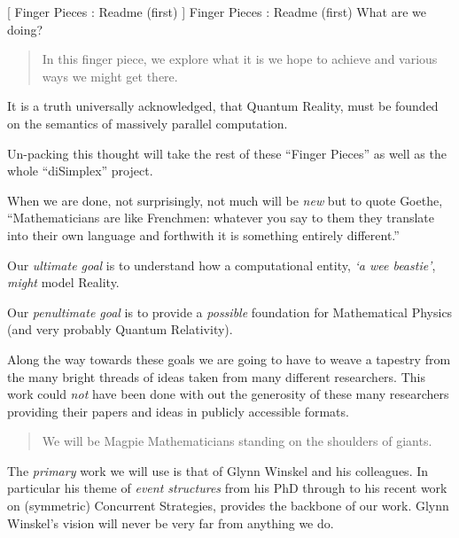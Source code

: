 
[
  Finger Pieces : Readme (first)
]{
  Finger Pieces : Readme (first) What are we doing?
}
\author{Stephen Gaito}

\maketitle

\begin{abstract}
  In this finger piece, we explore what it is we hope to achieve and various
  ways we might get there.
\end{abstract}


It is a truth universally acknowledged, that Quantum Reality, must be founded on
the semantics of massively parallel computation.

Un-packing this thought will take the rest of these ``Finger Pieces'' as well as
the whole ``diSimplex'' project. 

When we are done, not surprisingly, not much will be \emph{new} but to quote
Goethe, ``Mathematicians are like Frenchmen: whatever you say to them they
translate into their own language and forthwith it is something entirely
different.''

Our \emph{ultimate goal} is to understand how a computational entity, \emph{`a
wee beastie'}, \emph{might} model Reality.

Our \emph{penultimate goal} is to provide a \emph{possible} foundation for
Mathematical Physics (and very probably Quantum Relativity).

Along the way towards these goals we are going to have to weave a tapestry from
the many bright threads of ideas taken from many different researchers. This
work could \emph{not} have been done with out the generosity of these many
researchers providing their papers and ideas in publicly accessible formats.

\begin{quote}
  We will be Magpie Mathematicians standing on the shoulders of
  giants.
\end{quote}

The \emph{primary} work we will use is that of Glynn Winskel and his colleagues.
In particular his theme of \emph{event structures} from his PhD through to his
recent work on (symmetric) Concurrent Strategies, provides the backbone of our
work. Glynn Winskel's vision will never be very far from anything we do.

